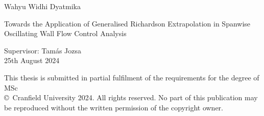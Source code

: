 {    \vfill
    Wahyu Widhi Dyatmika\par
    \vfill
    Towards the Application of Generalised Richardson Extrapolation in Spanwise Oscillating Wall Flow Control Analysis\par
    \vfill
    Supervisor: Tamás Jozsa\\
     25th August 2024\par
     \vfill
     This thesis is submitted in partial fulfilment of the requirements for the degree of MSc\\%
     \vfill
     \copyright\ Cranfield University 2024. All rights reserved.
    No part of this publication may be reproduced without the written
     permission of the copyright owner.
    \cleardoublepage
    \makeatother
}

